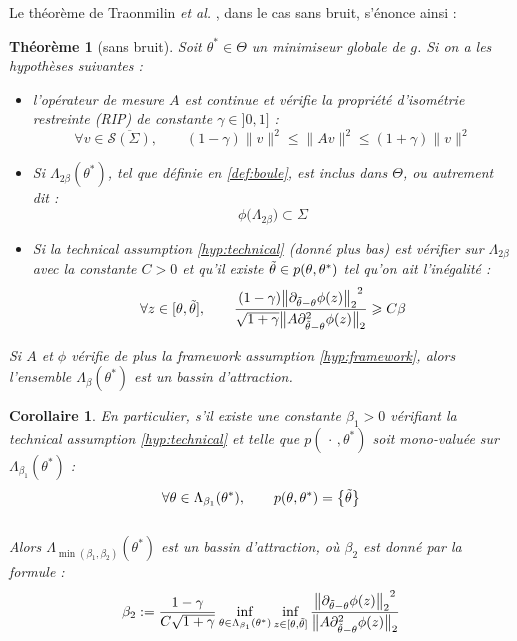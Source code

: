 \documentclass[hidelinks, french]{article} %
\renewcommand{\leq}{\leqslant}
\renewcommand{\geq}{\geqslant}
\newcommand{\etal}{\textit{et al. }}
\theoremstyle{enonce}
\newtheorem{theoreme}{Théorème}
\newtheorem{corollaire}{\qquad Corollaire}[theoreme]
\theoremstyle{special}
\theoremstyle{rq}
\theoremstyle{exo}
\theoremstyle{demo}
\begin{document}
Le théorème de Traonmilin \etal, dans le cas sans bruit, s'énonce ainsi :
\\
\begin{theoreme}[sans bruit]\label{theo:maintheo} Soit $\theta^*\in\Theta$ un minimiseur globale de $g$. Si on a les hypothèses suivantes :
\begin{itemize}
    \item l'opérateur de mesure $A$ est continue et vérifie la \emph{propriété d'isométrie restreinte} (RIP) de constante $\gamma\in]0,1]$ :
\begin{equation}\label{eq:RIP}
\forall v\in\overline{\mathcal{S}(\Sigma)},\qquad (1-\gamma)\|v\|^2\leq \|Av\|^2\leq (1+\gamma)\|v\|^2
\end{equation}

    \item Si $\Lambda_{2\beta}(\theta^*)$, tel que définie en \ref{def:boule}, est inclus dans $\Theta$, ou autrement dit :
\begin{equation}\label{eq:LambinTheta}
\phi\big(\Lambda_{2\beta}\big)\subset\Sigma
\end{equation}

    \item Si la \emph{technical assumption} \ref{hyp:technical} (donné plus bas) est vérifier sur $\Lambda_{2\beta}$ avec la constante $C>0$ et qu'il existe $\Tilde{\theta}\in p(\theta,\theta^*)$ tel qu'on ait l'inégalité :
\begin{equation}\label{eq:majo3}
\forall z\in[\theta,\Tilde{\theta}],\qquad \frac{(1-\gamma){\big\|\partial_{\Tilde{\theta}-\theta}\phi(z)\big\|_2}^2}{\sqrt{1+\gamma}\big\|A\partial^2_{\Tilde{\theta}-\theta}\phi(z)\big\|_2}\geq C\beta
\end{equation}
\end{itemize}

Si $A$ et $\phi$ vérifie de plus la \emph{framework assumption} \ref{hyp:framework}, alors l'ensemble $\Lambda_\beta(\theta^*)$ est un bassin d'attraction.  
\end{theoreme}

\begin{corollaire}
En particulier, s'il existe une constante $\beta_1>0$ vérifiant la \emph{technical assumption} \ref{hyp:technical} et telle que $p(\,\cdot\,, \theta^*)$ soit mono-valuée sur $\Lambda_{\beta_1}(\theta^*)$ :
\[\forall \theta\in\Lambda_{\beta_1}(\theta^*),\qquad p(\theta,\theta^*)=\big\{\Tilde{\theta}\big\}\]
\\
Alors $\Lambda_{\min(\beta_1,\beta_2)}(\theta^*)$ est un bassin d'attraction, où $\beta_2$ est donné par la formule :
\[\beta_2:=\frac{1-\gamma}{C\sqrt{1+\gamma}}\inf_{\theta\in\Lambda_{\beta_1}(\theta^*)}\inf_{z\in[\theta,\Tilde{\theta}]}\frac{{\big\|\partial_{\Tilde{\theta}-\theta}\phi(z)\big\|_2}^2}{\big\|A\partial^2_{\Tilde{\theta}-\theta}\phi(z)\big\|_2}\]
\end{corollaire}
\end{document}
